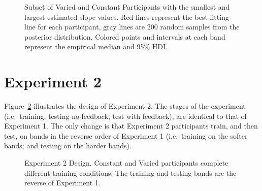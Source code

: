 \documentclass[
  letterpaper,
  DIV=11,
  numbers=noendperiod,
  oneside]{scrartcl}
\begin{document}
\begin{figure}
{{}


}

\caption{\label{fig-e1-indv-slopes}Subset of Varied and Constant
Participants with the smallest and largest estimated slope values. Red
lines represent the best fitting line for each participant, gray lines
are 200 random samples from the posterior distribution. Colored points
and intervals at each band represent the empirical median and 95\% HDI.}

\end{figure}%

\section{Experiment 2}\label{experiment-2}

Figure~\ref{fig-design-e2} illustrates the design of Experiment 2. The
stages of the experiment (i.e.~training, testing no-feedback, test with
feedback), are identical to that of Experiment 1. The only change is
that Experiment 2 participants train, and then test, on bands in the
reverse order of Experiment 1 (i.e.~training on the softer bands; and
testing on the harder bands).

\begin{figure}


\caption{\label{fig-design-e2}Experiment 2 Design. Constant and Varied
participants complete different training conditions. The training and
testing bands are the reverse of Experiment 1.}

\end{figure}%
\end{document}
